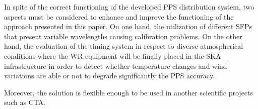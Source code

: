 In spite of the correct functioning of the developed PPS distribution system, 
two aspects must be considered to enhance and improve the functioning of the approach presented in this paper. 
On one hand, the utilization of different SFPs that present variable wavelengths causing calibration problems.
On the other hand, the evaluation of the timing system in respect to diverse atmospherical
conditions where the WR equipment will be finally placed in the SKA infrastructure in order to detect whether
temperature changes and wind variations are able or not to degrade significantly the PPS accuracy.

Moreover, the solution is flexible enough to be used in another scientific
projects such as CTA.  
